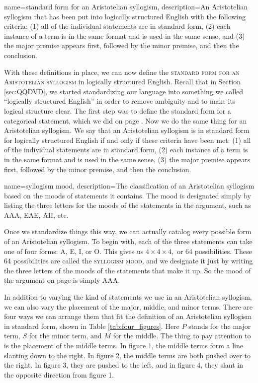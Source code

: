 {
name=standard form for an Aristotelian syllogism,
description={An Aristotelian syllogism that has been put into logically structured English with the following criteria: (1) all of the individual statements are in standard form, (2) each instance of a term is in the same format and is used in the same sense, and (3) the major premise appears first, followed by the minor premise, and then the conclusion.}
} 

With these definitions in place, we can now define the \textsc{\gls{standard form for an Aristotelian syllogism}} in logically structured English. \label{standard_form_for_an_Aristotelian_syllogism} Recall that in Section  \ref{sec:QQDVD}, we started standardizing our language into something we called ``logically structured English'' in order to remove ambiguity and to make its logical structure clear. The first step was to define the standard form for a categorical statement, which we did on page \pageref{def:standard_form_cat_statement}. Now we do the same thing for an Aristotelian syllogism. We say that an Aristotelian syllogism is in standard form for logically structured English if and only if these criteria have been met: (1) all of the individual statements are in standard form, (2) each instance of a term is in the same format and is used in the same sense, (3) the major premise appears first, followed by the minor premise, and then the conclusion.

{
name=syllogism mood,
description={The classification of an Aristotelian syllogism based on the moods of statements it contains. The mood is designated simply by listing the three letters for the moods of the statements in the argument, such as AAA, EAE, AII, etc.}
} 

Once we standardize things this way, we can actually catalog every possible form of an Aristotelian syllogism. To begin with, each of the three statements can take one of four forms: A, E, I, or O. This gives us $4 \times 4 \times 4,$ or 64 possibilities. These 64 possibilities are called the \textsc{\gls{syllogism mood}}, and we designate it just by writing the three letters of the moods of the statements that make it up. So the mood of the argument on page \pageref{AAA_arg} is simply AAA. 

In addition to varying the kind of statements we use in an Aristotelian syllogism, we can also vary the placement of the major, middle, and minor terms. There are four ways we can arrange them that fit the definition of an Aristotelian syllogism in standard form, shown in Table \ref{tab:four_figures}. Here $P$ stands for the major term, $S$ for the minor term, and $M$ for the middle. The thing to pay attention to is the placement of the middle terms. In figure 1, the middle terms form a line slanting down to the right. In figure 2, the middle terms are both pushed over to the right. In figure 3, they are pushed to the left, and in figure 4, they slant in the opposite direction from figure 1.


